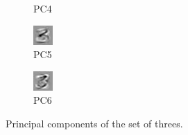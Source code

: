\documentclass[twocolumn]{article}
\begin{document}
\begin{figure}
\begin{subfigure}[b]{0.07\textwidth}
            \caption{PC4}
            \label{fig:pc4}
    \end{subfigure}
    \begin{subfigure}[b]{0.07\textwidth}
            \centering
            \includegraphics[width=\textwidth]{figs/pc5.jpg}
            \caption{PC5}
            \label{fig:pc5}
    \end{subfigure}
    \begin{subfigure}[b]{0.07\textwidth}
            \centering
            \includegraphics[width=\textwidth]{figs/pc6.jpg}
            \caption{PC6}
            \label{fig:pc6}
    \end{subfigure}
    \label{fig:pcs}
    \caption{Principal components of the set of threes.}
\end{figure}
\end{document}
